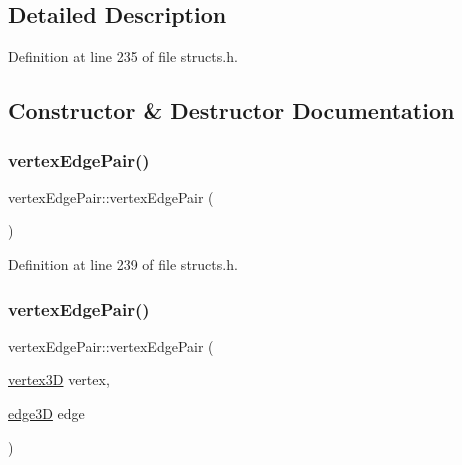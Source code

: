 \subsection{Detailed Description}


Definition at line 235 of file structs.\+h.



\subsection{Constructor \& Destructor Documentation}
\mbox{\label{structvertex_edge_pair_a8186fec8ce5239705015fe738152a986}} 
\subsubsection{\texorpdfstring{vertex\+Edge\+Pair()}{vertexEdgePair()}\hspace{0.1cm}{\footnotesize\ttfamily [1/2]}}
{\footnotesize\ttfamily vertex\+Edge\+Pair\+::vertex\+Edge\+Pair (\begin{DoxyParamCaption}{ }\end{DoxyParamCaption})\hspace{0.3cm}{\ttfamily [inline]}}



Definition at line 239 of file structs.\+h.

\mbox{\label{structvertex_edge_pair_a845d184b645d35be5223420014fa63e8}} 
\subsubsection{\texorpdfstring{vertex\+Edge\+Pair()}{vertexEdgePair()}\hspace{0.1cm}{\footnotesize\ttfamily [2/2]}}
{\footnotesize\ttfamily vertex\+Edge\+Pair\+::vertex\+Edge\+Pair (\begin{DoxyParamCaption}\item[{\mbox{\hyperlink{structvertex3_d}{vertex3D}}}]{vertex,  }\item[{\mbox{\hyperlink{structedge3_d}{edge3D}}}]{edge }\end{DoxyParamCaption})\hspace{0.3cm}{\ttfamily [inline]}}



